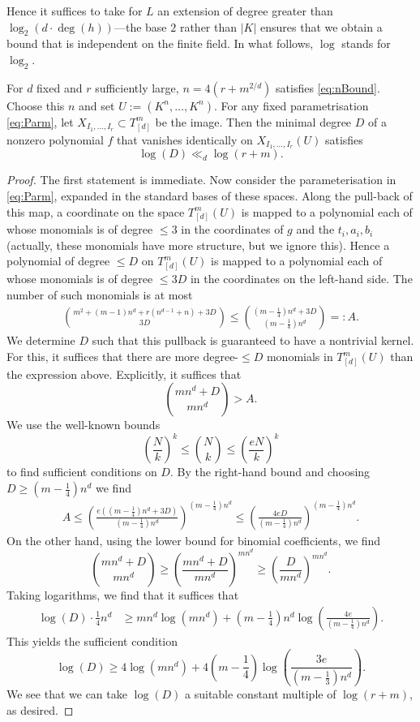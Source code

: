 \documentclass{amsart}
\begin{document}
Hence it suffices to take for $L$ an extension of degree greater than
$ \log_2 (d \cdot \deg(h)) $---the base $2$ rather than
$|K|$ ensures that we obtain a bound that is independent on the finite
field. In what follows, $\log$ stands for $\log_2$. 

\begin{prop} \label{prop:DegBound}
For $d$ fixed and $r$ sufficiently large, $n=4(r+m^{2/d})$ satisfies
 \eqref{eq:nBound}. Choose this $n$ and set $U:=(K^n,\ldots,K^n)$. For any fixed parametrisation \eqref{eq:Parm}, let $X_{I_1,\ldots,I_r} \subset T^m_{[d]}$ be the image. Then the
minimal degree $D$ of a nonzero polynomial $f$ that vanishes identically
on $X_{I_1,\ldots,I_r}(U) $ satisfies
\[ \log(D) \ll_d \log(r+m). \]
\end{prop}

\begin{proof}
The first statement is immediate. Now consider the parameterisation in
\eqref{eq:Parm}, expanded in the standard bases of these spaces.  Along
the pull-back of this map, a coordinate on the space $T^{m}_{[d]}(U)$
is mapped to a polynomial each of whose monomials is of degree $\leq 3$
in the coordinates of $g$ and the $t_i,a_i,b_i$ (actually, these monomials
have more structure, but we ignore this). Hence a polynomial of degree
$\leq D$ on $T^{m}_{[d]}(U)$ is mapped to a polynomial each of whose
monomials is of degree $\leq 3D$ in the coordinates on the left-hand
side. The number of such monomials is at most
\begin{align*} 
\binom{m^2 + (m-1)n^d + r(n^{d-1}+n)+3D}{3D} 
\leq \binom{(m-\frac{1}{4})n^d +
3D}{(m-\frac{1}{4})n^d}=:A.
\end{align*}
We determine $D$ such that this pullback is guaranteed to have
a nontrivial kernel. For this, it suffices that there are more
degree-$\leq D$ monomials in $T^{m}_{[d]}(U)$ than the expression above.
Explicitly, it suffices that 
\[ \binom{mn^d + D}{mn^d} > A. \]
We use the well-known bounds 
\[ \left(\frac{N}{k}\right)^k \leq \binom{N}{k} \leq
\left(\frac{eN}{k}\right)^k \]
to find sufficient conditions on $D$. By the right-hand bound and
choosing $D \geq (m-\frac{1}{4})n^d$ we find 
\begin{align*} A \leq 
\left( \frac{e((m-\frac14)n^d + 3D)}{(m-\frac14)n^d}
\right)^{(m-\frac14)n^d} 
\leq 
\left( \frac{4eD}{(m-\frac14)n^d} \right)^{(m-\frac14)n^d}. 
\end{align*}
On the other hand, using the lower bound for binomial coefficients, we
find 
\[ \binom{mn^d+D}{mn^d} \geq \left( \frac{mn^d+D}{mn^d} \right)^{mn^d}
\geq \left( \frac{D}{mn^d} \right)^{mn^d}. \]
Taking logarithms, we find that it suffices that 
\begin{align*} \log(D)\cdot \frac{1}{4}n^d &\geq  mn^d \log(mn^d) 
+ 
(m-\frac14)n^d\log\left(\frac{4e}{(m-\frac14)n^d}\right). 
\end{align*}
This yields the sufficient
condition  
\[ \log(D) \geq 4\log(mn^d) 
+ 4(m-\frac14) \log\left(\frac{3e}{(m-\frac13)n^d}\right). \] 
We see that we can take $\log(D)$ a suitable constant multiple of
$\log(r+m)$, as desired. 
\end{proof}
\end{document}
